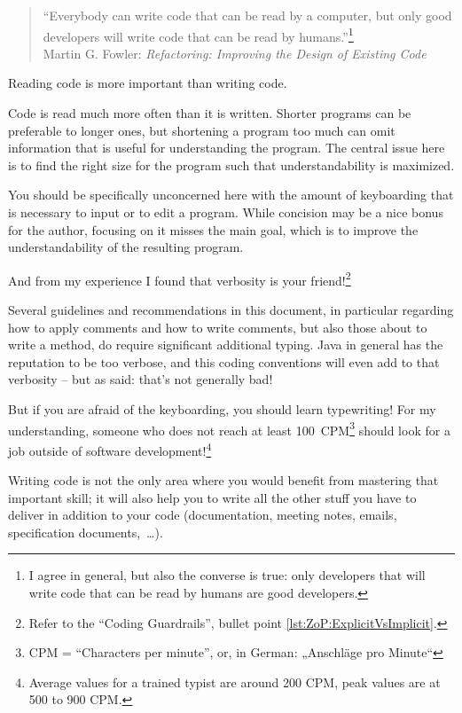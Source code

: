 \documentclass[11pt,a4paper, titlepage, parskip=half, headsepline, footsepline, cleardoublepage=current, headheight=1cm]{scrbook}
\begin{document}
\begin{quote}
“Everybody can write code that can be read by a computer, but only good developers will write code that can be read by humans.”\footnote{I agree in general, but also the converse is true: only developers that will write code that can be read by humans are good developers.} \\
Martin G. Fowler: \textit{Refactoring: Improving the Design of Existing Code}\autocite{Fowler:Refactoring}
\end{quote}

Reading code is more important than writing code.\autocite{Marks:LocalVariableTypeInference:ReadingIsMoreImportantThanWriting}

Code is read much more often than it is written. Shorter programs can be preferable to longer ones, but shortening a program too much can omit information that is useful for understanding the program. The central issue here is to find the right size for the program such that understandability is maximized.

You should be specifically unconcerned here with the amount of keyboarding that is necessary to input or to edit a program. While concision may be a nice bonus for the author, focusing on it misses the main goal, which is to improve the understandability of the resulting program.

And from my experience I found that verbosity is your friend!\footnote{Refer to the “Coding Guardrails”, bullet point \ref{lst:ZoP:ExplicitVsImplicit}.}

Several guidelines and recommendations in this document, in particular regarding how to apply comments and how to write comments, but also those about to write a method, do require significant additional typing. Java in general has the reputation to be too verbose, and this coding conventions will even add to that verbosity – but as said: that's not generally bad!

But if you are afraid of the keyboarding, you should learn typewriting! For my understanding, someone who does not reach at least 100~CPM\footnote{CPM = “Characters per minute”, or, in German: „Anschläge pro Minute“} should look for a job outside of software development!\footnote{Average values for a trained typist are around 200 CPM, peak values are at 500 to 900 CPM.}

Writing code is not the only area where you would benefit from mastering that important skill; it will also help you to write all the other stuff you have to deliver in addition to your code (documentation, meeting notes, emails, specification documents,~…).
\end{document}
